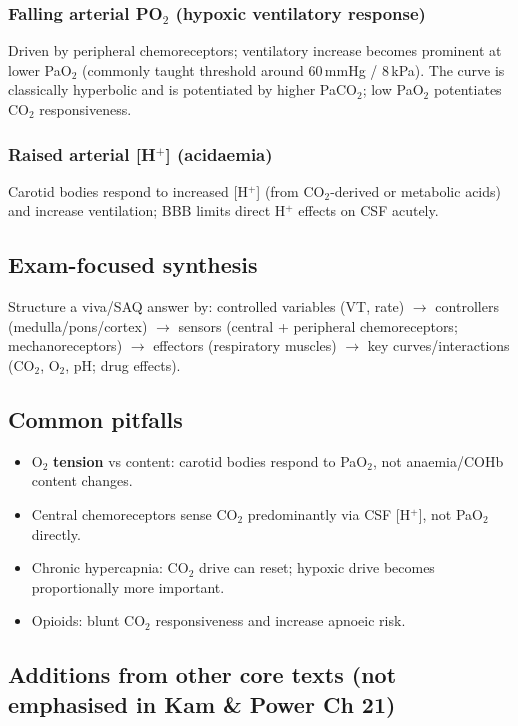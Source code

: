 \documentclass[11pt,a4paper]{article}
\begin{document}
\subsubsection{Falling arterial PO$_2$ (hypoxic ventilatory response)}
Driven by peripheral chemoreceptors; ventilatory increase becomes prominent at lower PaO$_2$ (commonly taught threshold around 60\,mmHg / 8\,kPa). The curve is classically hyperbolic and is potentiated by higher PaCO$_2$; low PaO$_2$ potentiates CO$_2$ responsiveness.

\subsubsection{Raised arterial [H$^+$] (acidaemia)}
Carotid bodies respond to increased [H$^+$] (from CO$_2$-derived or metabolic acids) and increase ventilation; BBB limits direct H$^+$ effects on CSF acutely.

\subsection{Exam-focused synthesis}
Structure a viva/SAQ answer by: controlled variables (VT, rate) $\rightarrow$ controllers (medulla/pons/cortex) $\rightarrow$ sensors (central + peripheral chemoreceptors; mechanoreceptors) $\rightarrow$ effectors (respiratory muscles) $\rightarrow$ key curves/interactions (CO$_2$, O$_2$, pH; drug effects).

\subsection{Common pitfalls}
\begin{itemize}
  \item O$_2$ \textbf{tension} vs content: carotid bodies respond to PaO$_2$, not anaemia/COHb content changes.
  \item Central chemoreceptors sense CO$_2$ predominantly via CSF [H$^+$], not PaO$_2$ directly.
  \item Chronic hypercapnia: CO$_2$ drive can reset; hypoxic drive becomes proportionally more important.
  \item Opioids: blunt CO$_2$ responsiveness and increase apnoeic risk.
\end{itemize}

\subsection{Additions from other core texts (not emphasised in Kam \& Power Ch 21)}
\end{document}
